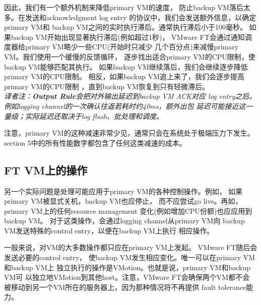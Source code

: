 因此，我们有一个额外机制来降低primary VM的速度，%
防止backup VM落后太多。在发送和acknowledgment log entry%
的协议中，我们会发送额外信息，以确定primary VM和%
backup VM之间的实时执行滞后。通常执行滞后小于100毫秒。%
如果backup VM开始出现显著执行滞后(例如超过1秒)，%
VMware FT会通过通知调度器给primary VM略少一些CPU(开始时只减少%
几个百分点)来减慢primary VM。我们使用一个缓慢的反馈循环，%
逐步找出适合primary VM的CPU限制，使backup VM能够匹配其执行。%
如果backup VM继续落后，我们会继续逐步降低primary VM的CPU限制。%
相反，如果backup VM追上来了，我们会逐步提高primary VM的CPU限制%
，直到backup VM恢复到只有轻微滞后。%
\\\emph{译者注：\textbf{Output Rule}会把对外输出延迟到backup VM ACK对应%
log entry之后。例如logging channel的一次确认往返若耗时约40ms，额外出包%
延迟可能接近这一量级；实际延迟还取决于log flush、批处理和调度。}%

注意，primary VM的这种减速非常少见，通常只会在系统处于极端压力下发生。%
section 5中的所有性能数字都包含了任何这类减速的成本。

\subsection{FT VM上的操作}

另一个实际问题是处理可能应用于primary VM的各种控制操作。例如，%
如果primary VM被显式关机，backup VM也应停止，%
而不应尝试go live。再如，primary VM上的任何resource management%
变化(例如增加CPU份额)也应应用到backup VM。%
对于这类操作，会通过logging channel从primary VM向%
backup VM发送特殊的control entry，以便在backup VM上执行%
相应操作。%

一般来说，对VM的大多数操作都只应在primary VM上发起。%
VMware FT随后会发送必要的control entry，%
使backup VM发生相应变化。唯一可以在primary VM和backup VM上%
独立执行的操作是VMotion。也就是说，primary VM和backup VM可%
以独立地VMotion到其他host。注意，VMware FT会确保两个VM都不会%
被移动到另一个VM所在的服务器上，因为那种情况将不再提供%
fault tolerance能力。%

